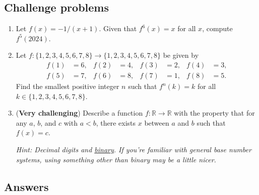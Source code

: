 \subsection{Challenge problems}

\begin{enumerate}[resume]
\item Let $f(x) = -1/(x + 1)$. Given that $f^6(x) = x$ for all $x$, compute $f^5(2024)$.
\item Let $f:\{1,2,3,4,5,6,7,8\}\to\{1,2,3,4,5,6,7,8\}$ be given by
\begin{align*}
f(1) &= 6, & f(2) &= 4, & f(3) &= 2, & f(4) &= 3, \\
f(5) &= 7, & f(6) &= 8, & f(7) &= 1, & f(8) &= 5.
\end{align*}
Find the smallest positive integer $n$ such that $f^n(k) = k$ for all $k\in\{1, 2, 3, 4, 5, 6, 7, 8\}$.
\item (\textbf{Very challenging}) Describe a function $f:\mathbb{R}\to\mathbb{R}$ with the property that for any $a$, $b$, and $c$ with $a < b$, there exists $x$ between $a$ and $b$ such that $f(x) = c$.\par
\emph{Hint: Decimal digits and \href{https://en.wikipedia.org/wiki/Binary_number}{binary}. If you're familiar with general base number systems, using something other than binary may be a little nicer.}
\end{enumerate}


\newpage
\subsection{Answers}
